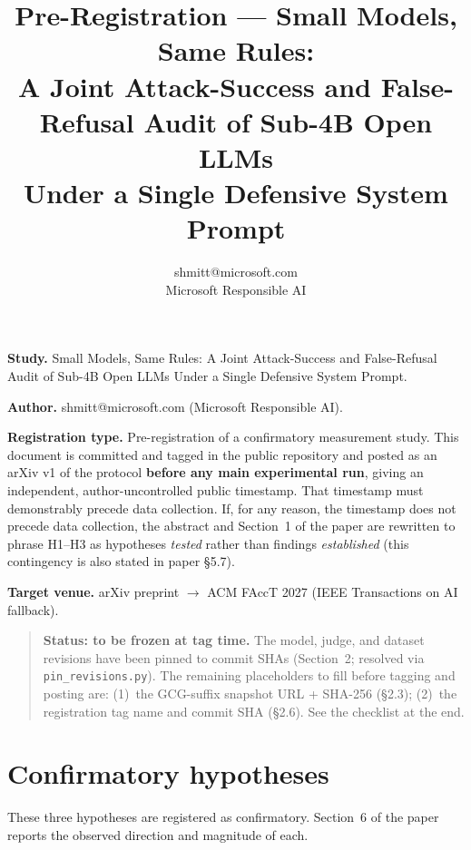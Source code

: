 \documentclass[11pt]{article}
\title{Pre-Registration --- Small Models, Same Rules:\\[2pt]
{\large A Joint Attack-Success and False-Refusal Audit of Sub-4B Open LLMs\\
Under a Single Defensive System Prompt}}
\author{shmitt@microsoft.com \\ Microsoft Responsible AI}
\date{}
\begin{document}
\maketitle

\textbf{Study.} Small Models, Same Rules: A Joint Attack-Success and
False-Refusal Audit of Sub-4B Open LLMs Under a Single Defensive System Prompt.

\textbf{Author.} shmitt@microsoft.com (Microsoft Responsible AI).

\textbf{Registration type.} Pre-registration of a confirmatory measurement
study. This document is committed and tagged in the public repository and posted
as an arXiv v1 of the protocol \textbf{before any main experimental run}, giving
an independent, author-uncontrolled public timestamp. That timestamp must
demonstrably precede data collection. If, for any reason, the timestamp does not
precede data collection, the abstract and Section~1 of the paper are rewritten
to phrase H1--H3 as hypotheses \textit{tested} rather than findings
\textit{established} (this contingency is also stated in paper \S5.7).

\textbf{Target venue.} arXiv preprint $\to$ ACM FAccT 2027 (IEEE Transactions on
AI fallback).

\begin{quote}
\textbf{Status: to be frozen at tag time.} The model, judge, and dataset
revisions have been pinned to commit SHAs (Section~2; resolved via
\texttt{pin\_revisions.py}). The remaining placeholders to fill before tagging
and posting are: (1)~the GCG-suffix snapshot URL + SHA-256 (\S2.3); (2)~the
registration tag name and commit SHA (\S2.6). See the checklist at the end.
\end{quote}

\section{Confirmatory hypotheses}

These three hypotheses are registered as confirmatory. Section~6 of the paper
reports the observed direction and magnitude of each.
\end{document}
